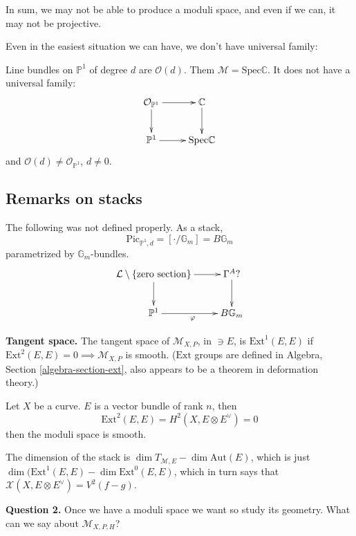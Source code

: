 In sum, we may not be able to produce a moduli space, and even if we can, it may
not be projective.

Even in the easiest situation we can have, we don't have universal family:

\begin{example}
\label{example-moduli-space-of-line-bundles-of-degree-d-over-P1-
do-not-have-universal-family}
Line bundles on $\mathbb{P}^1$ of degree $d$ are $\mathcal{O}(d)$. Them
$\mathcal{M}=\text{Spec}\mathbb{C}$. It does not have a universal family:
$$
\xymatrix{
\mathcal{O}_{\mathbb{P}^1}\ar[r]\ar[d]&\mathbb{C}\ar[d]\\
\mathbb{P}^1\ar[r]&\text{Spec}\mathbb{C}
}
$$
and $\mathcal{O}(d) \neq \mathcal{O}_{\mathbb{P}^1}$, $d\neq 0$.
\end{example}



\subsection*{Remarks on stacks}
\label{subsection-remarks-on-stacks}

The following was not defined properly. As a stack,
$$
\text{Pic}_{\mathbb{P}^1,d}=\left[ \cdot/\mathbb{G}_m \right] = B\mathbb{G}_m
$$
parametrized by $\mathbb{G}_m$-bundles.
$$
\xymatrix{
\mathcal{L}\setminus\{\text{zero section}\}\ar[r]\ar[d]&\Gamma^A?\ar[d]\\
\mathbb{P}^1\ar[r]_\varphi&B\mathbb{G}_m
}
$$

{\bf Tangent space.} The tangent space of $\mathcal{M}_{X,P}$, in $\ni E$, is
$\text{Ext}^1(E,E)$ if $\text{Ext}^2(E,E)=0 \implies  \mathcal{M}_{X,P}$ is
smooth. ($\text{Ext}$ groups are defined in Algebra, Section
\ref{algebra-section-ext}, also appears to be a theorem in deformation theory.)

\begin{example}
\label{example-moduli-space-of-curves-is-smooth}
Let $X$ be a curve. $E$ is a vector bundle of rank $n$, then
$$
\text{Ext}^2(E,E)=H^{2}(X,E \otimes E^{\vee})=0
$$
then the moduli space is smooth.
\end{example}

The dimension of the stack is $\dim T_{\mathcal{M},E}-\dim \text{Aut}(E)$, which
is just $\dim (\text{Ext}^1(E,E) - \dim \text{Ext}^0(E,E)$, which in turn says
that $\mathcal{X}(X,E \otimes E^\vee)=V^2(f-g)$.

{\bf Question 2.} Once we have a moduli space we want so study its geometry. 
What can we say about $\mathcal{M}_{X,P,H}$?

